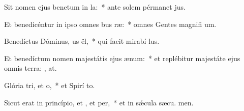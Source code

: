 \item Sit nomen ejus benetum in la:~* ante solem pérmanet  jus.
\item Et benedicéntur in ipso omnes bus ræ:~* omnes Gentes magnifi um.
\item Benedíctus Dóminus, us ël,~* qui facit mirabí lus.
\item Et benedíctum nomen majestátis ejus  ænum:~* et replébitur majestáte ejus omnis terra: , at.
\item Glória tri, et o,~* et Spirí to.
\item Sicut erat in princípio, et , et per,~* et in sǽcula sæcu. men.
